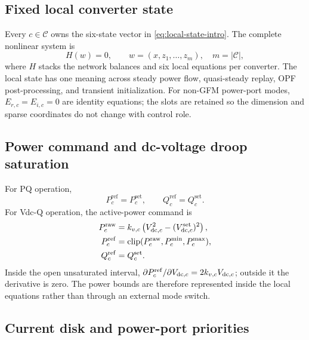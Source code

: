 \subsection{Fixed local converter state}

Every $c\in\mathcal C$ owns the six-state vector in
\eqref{eq:local-state-intro}. The complete nonlinear system is
\begin{equation}
 H(w)=0,\qquad
 w=(x,z_1,\ldots,z_m),\quad m=|\mathcal C|,
 \label{eq:complete-system}
\end{equation}
where $H$ stacks the network balances and six local equations per converter.
The local state has one meaning across steady power flow, quasi-steady replay,
OPF post-processing, and transient initialization. For non-GFM power-port
modes, $E_{r,c}=E_{i,c}=0$ are identity equations; the slots are retained so
the dimension and sparse coordinates do not change with control role.

\subsection{Power command and dc-voltage droop saturation}

For PQ operation,
\begin{equation}
 P_c^{\mathrm{ref}}=P_c^{\mathrm{set}},\qquad
 Q_c^{\mathrm{ref}}=Q_c^{\mathrm{set}}.
\end{equation}
For Vdc-Q operation, the active-power command is
\begin{subequations}\label{eq:vdc-droop}
\begin{align}
 P_c^{\mathrm{raw}}
 &=k_{v,c}\left(V_{\mathrm{dc},c}^{2}-(V_{\mathrm{dc},c}^{\mathrm{set}})^2\right),\\
 P_c^{\mathrm{ref}}
 &=\operatorname{clip}(P_c^{\mathrm{raw}},P_c^{\min},P_c^{\max}),\\
 Q_c^{\mathrm{ref}}&=Q_c^{\mathrm{set}}.
\end{align}
\end{subequations}
Inside the open unsaturated interval,
$\partial P_c^{\mathrm{ref}}/\partial V_{\mathrm{dc},c}=2k_{v,c}V_{\mathrm{dc},c}$;
outside it the derivative is zero. The power bounds are therefore represented
inside the local equations rather than through an external mode switch.

\subsection{Current disk and power-port priorities}

